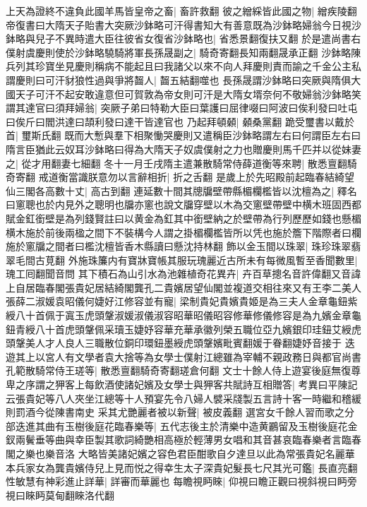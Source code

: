上天為證終不違負此國羊馬皆皇帝之畜|{
	畜許救翻}
彼之繒綵皆此國之物|{
	繒疾陵翻}
帝復書曰大隋天子貽書大突厥沙鉢略可汗得書知大有善意既為沙鉢略婦翁今日視沙鉢略與兒子不異時遣大臣往彼省女復省沙鉢略也|{
	省悉景翻復扶又翻}
於是遣尚書右僕射虞慶則使於沙鉢略驍騎將軍長孫晟副之|{
	騎奇寄翻長知兩翻晟承正翻}
沙鉢略陳兵列其珍寶坐見慶則稱病不能起且曰我諸父以來不向人拜慶則責而諭之千金公主私謂慶則曰可汗豺狼性過與爭將齧人|{
	齧五結翻噬也}
長孫晟謂沙鉢略曰突厥與隋俱大國天子可汗不起安敢違意但可賀敦為帝女則可汗是大隋女壻奈何不敬婦翁沙鉢略笑謂其達官曰須拜婦翁|{
	突厥子弟曰特勒大臣曰葉護曰屈律啜曰阿波曰俟利發曰吐屯曰俟斤曰閻洪達曰頡利發曰達干皆達官也}
乃起拜頓顙|{
	顙桑黨翻}
跪受璽書以戴於首|{
	璽斯氏翻}
既而大慙與羣下相聚慟哭慶則又遣稱臣沙鉢略謂左右曰何謂臣左右曰隋言臣猶此云奴耳沙鉢略曰得為大隋天子奴虞僕射之力也贈慶則馬千匹并以從妹妻之|{
	從才用翻妻七細翻}
冬十一月壬戌隋主遣兼散騎常侍薛道衡等來聘|{
	散悉亶翻騎奇寄翻}
戒道衡當識朕意勿以言辭相折|{
	折之舌翻}
是歲上於先昭殿前起臨春結綺望仙三閣各高數十丈|{
	高古到翻}
連延數十間其牕牖壁帶縣楣欄檻皆以沈檀為之|{
	釋名曰窻聰也於内見外之聰明也牖亦窻也說文牖穿壁以木為交窻壁帶壁中横木班固西都賦金釭銜壁是為列錢賢註曰以黄金為釭其中銜壁納之於壁帶為行列歷歷如錢也懸楣横木施於前後兩楹之間下不裝構今人謂之掛楣欄檻皆所以凭也施於簷下階際者曰欄施於窻牖之間者曰檻沈檀皆香木縣讀曰懸沈持林翻}
飾以金玉間以珠翠|{
	珠珍珠翠翡翠毛間古莧翻}
外施珠簾内有寶牀寶帳其服玩瑰麗近古所未有每微風暫至香聞數里|{
	瑰工囘翻聞音問}
其下積石為山引水為池雜植奇花異卉|{
	卉百草摠名音許偉翻又音諱}
上自居臨春閣張貴妃居結綺閣龔孔二貴嬪居望仙閣並複道交相往來又有王李二美人張薛二淑媛袁昭儀何婕好江修容並有寵|{
	梁制貴妃貴嬪貴姬是為三夫人金章龜鈕紫綬八十首佩于寘玉虎頭鞶淑媛淑儀淑容昭華昭儀昭容修華修儀修容是為九嬪金章龜鈕青綬八十首虎頭鞶佩采瓄玉婕妤容華充華承徽列榮五職位亞九嬪銀印珪鈕艾綬虎頭鞶美人才人良人三職散位銅印環鈕墨綬虎頭鞶嬪毗賓翻媛于眷翻婕妤音接于}
迭遊其上以宮人有文學者袁大捨等為女學士僕射江總雖為宰輔不親政務日與都官尚書孔範散騎常侍王瑳等|{
	散悉亶翻騎奇寄翻瑳倉何翻}
文士十餘人侍上遊宴後庭無復尊卑之序謂之狎客上每飲酒使諸妃嬪及女學士與狎客共賦詩互相贈答|{
	考異曰平陳記云張貴妃等八人夾坐江總等十人預宴先令八婦人襞采牋製五言詩十客一時繼和稽緩則罰酒今從陳書南史}
采其尤艷麗者被以新聲|{
	被皮義翻}
選宮女千餘人習而歌之分部迭進其曲有玉樹後庭花臨春樂等|{
	五代志後主於清樂中造黄鸝留及玉樹後庭花金釵兩鬢垂等曲與幸臣製其歌詞綺艷相高極於輕薄男女唱和其音甚哀臨春樂者言臨春閣之樂也樂音洛}
大略皆美諸妃嬪之容色君臣酣歌自夕達旦以此為常張貴妃名麗華本兵家女為龔貴嬪侍兒上見而悦之得幸生太子深貴妃髮長七尺其光可鑑|{
	長直亮翻}
性敏慧有神彩進止詳華|{
	詳審而華麗也}
每瞻視眄睞|{
	仰視曰瞻正觀曰視斜視曰眄旁視曰睞眄莫甸翻睞洛代翻}
